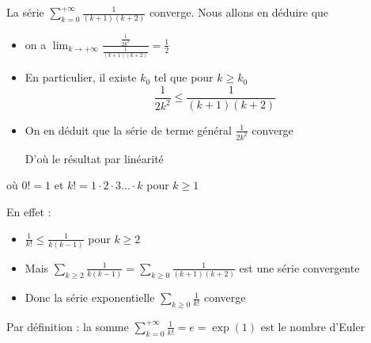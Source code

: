 \begin{frame}

\begin{exemple}
\pause
La série
$
\displaystyle\sum_{k=0}^{+\infty} \frac{1}{(k+1)(k+2)} $ converge. Nous allons en déduire que
\vspace{-.2cm}
\vspace{-.2cm}
\pause
\begin{itemize}
\item on a 
$
\displaystyle\lim_{k\to+\infty}
\frac{\frac{1}{2k^2}}{\frac{1}{(k+1)(k+2)}}=\frac{1}{2}
$
\item\pause En particulier, il existe $k_0$ tel que pour $k \ge k_0$
\vspace{-1ex}
$$
\frac{1}{2k^2} \le \frac{1}{(k+1)(k+2)}
$$
\item\pause On en déduit que la série de terme général $\frac{1}{2k^2}$ converge

\pause
D'où le résultat par linéarité
\end{itemize}
\end{exemple}

\end{frame}

\begin{frame}

\begin{exemple}
\vspace{-.1cm}
où $0!=1$ et $k!=1\cdot 2\cdot 3\dots \cdot k$ pour $k\ge 1$

\pause
\vspace{.2cm}
En effet :
\begin{itemize}
\item $\frac{1}{k!}\le \frac{1}{k(k-1)}$ pour $k \ge 2$
\item\pause Mais $\displaystyle\sum_{k \ge 2}\frac{1}{k(k-1)} = \displaystyle\sum_{k\ge0} \frac{1}{(k+1)(k+2)}$
est une série convergente
\item\pause Donc la série exponentielle $\displaystyle\sum_{k\ge 0} \frac{1}{k!}$ converge
\end{itemize}
\vspace{-.1cm}
\pause
Par définition : la somme $\displaystyle\sum_{k=0}^{+\infty} \frac{1}{k!} =e = \exp(1)$ est le nombre d'Euler
\end{exemple}

\end{frame}

